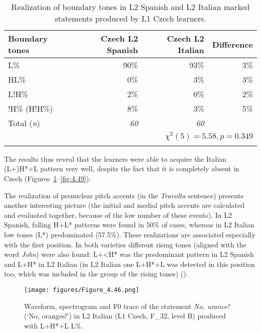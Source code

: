 \begin{table}
\begin{tabularx}{\textwidth}{Qrrr}

\lsptoprule

{Boundary tones} & {Czech L2 Spanish} & {Czech L2 Italian} & {Difference}\\
\midrule
L\% &  90\% &  93\% &  3\%\\
HL\% &  0\% & 3\% &  3\%\\
L!H\% &  2\% &  0\% & 2\%\\
!H\% (H!H\%) &  8\% &  3\% &  5\%\\
\midrule
Total (\textit{n}) & {\itshape 60} & {\itshape 60} &  \\
\\
\lspbottomrule
\end{tabularx}

\caption{Realization of boundary tones in L2 Spanish and L2 Italian marked statements produced by L1 Czech learners.}
\label{tab:4.15}
\end{table}

\begin{sloppypar}
The results thus reveal that the learners were able to acquire the Italian (L+)H*+L pattern very well, despite the fact that it is completely absent in Czech (Figures~\ref{fig:4.46}--\ref{fig:4.49}).
\end{sloppypar}

The realization of prenuclear pitch accents (in the \textit{Travolta}{} sentence) presents another interesting picture (the initial and medial pitch accents are calculated and evaluated together, because of the low number of these events). In L2 Spanish, falling H+L* patterns were found in 50\% of cases, whereas in L2 Italian low tones (L*) predominated (57.5\%). These realizations are associated especially with the first position. In both varieties different rising tones (aligned with the word \textit{John}) were also found: L+<H* was the predominant pattern in L2 Spanish and L+H* in L2 Italian (in L2 Italian one L+H*+L was detected in this position too, which was included in the group of the rising tones) ().

\begin{figure}
\texttt{[image: figures/Figure\_4.46.png]}
\caption{Waveform, spectrogram and F0 trace of the statement \textit{No, arance!} (‘No, oranges!’) in L2 Italian (L1 Czech, F\_32, level B) produced with L+H*+L L\%.}
\label{fig:4.46}
\end{figure}

